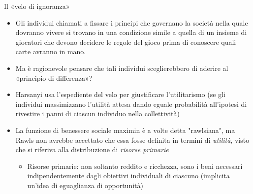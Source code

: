 \documentclass[11pt]{beamer}
\begin{document}
\begin{frame}{Il «velo di ignoranza»}
\begin{itemize}
\item Gli individui chiamati a fissare i principi che governano la società nella
quale dovranno vivere si trovano in una condizione simile a quella di un
insieme di giocatori che devono decidere le regole del gioco prima di
conoscere quali carte avranno in mano.
\item Ma è ragionevole pensare che tali individui sceglierebbero di aderire al
«principio di differenza»?
\item Harsanyi usa l'espediente del velo per giustificare l'utilitarismo (se gli
individui massimizzano l'utilità attesa dando eguale probabilità all'ipotesi
di rivestire i panni di ciascun individuo nella collettività)

\item La funzione di benessere sociale maximin è a volte detta "rawlsiana", ma
Rawls non avrebbe accettato che essa fosse definita in termini di \emph{utilità},
visto che si riferiva alla distribuzione di \emph{risorse primarie}
\begin{itemize}
\item Risorse primarie: non soltanto reddito e ricchezza, sono i beni necessari
indipendentemente dagli obiettivi individuali di ciascuno (implicita
un'idea di eguaglianza di opportunità)
\end{itemize}
\end{itemize}
\end{frame}
\end{document}

